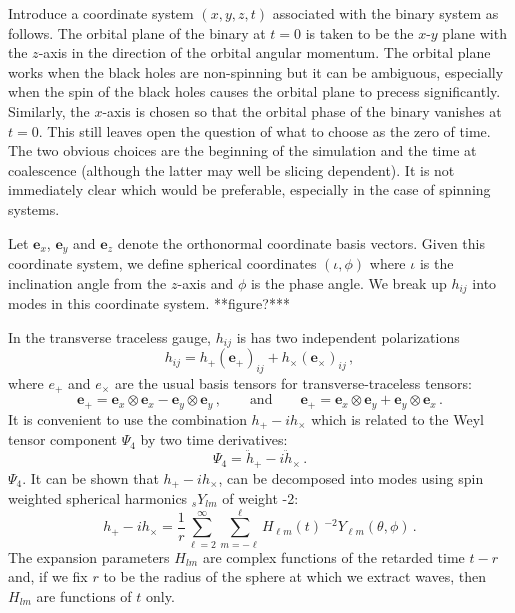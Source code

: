 \documentclass[amsmath,amssymb]{article}
\begin{document}
Introduce a coordinate system $(x,y,z,t)$ associated with the binary
system as follows.  The orbital plane of the binary at $t=0$ is taken to
be the $x$-$y$ plane with the $z$-axis in the direction of the orbital
angular momentum.  The orbital plane works when the black holes are
non-spinning but it can be ambiguous, especially when the spin of the
black holes causes the orbital plane to precess significantly.
Similarly, the $x$-axis is chosen so that the orbital phase of the
binary vanishes at $t=0$.   This still leaves open the question of what
to choose as the zero of time.  The two obvious choices are the
beginning of the simulation and the time at coalescence (although the
latter may well be slicing dependent).  It is not immediately clear
which would be preferable, especially in the case of spinning systems.

Let $\mathbf{e}_x$, $\mathbf{e}_y$ and $\mathbf{e}_z$ denote the
orthonormal coordinate basis vectors. Given this coordinate system, we
define spherical coordinates $(\iota,\phi)$ where $\iota$ is the
inclination angle from the $z$-axis and $\phi$ is the phase angle.  We
break up $h_{ij}$ into modes in this coordinate system. **figure?***

In the transverse traceless gauge, $h_{ij}$ is has two independent
polarizations 
\begin{equation}
  \label{eq:2}
  h_{ij} = h_+ (\mathbf{e}_+)_{ij} + h_\times (\mathbf{e}_\times)_{ij}\,,
\end{equation}
where $e_+$ and $e_\times$ are the usual basis tensors for
transverse-traceless tensors:
\begin{equation}
  \label{eq:9}
  \mathbf{e}_+ = \mathbf{e}_x\otimes\mathbf{e}_x -
  \mathbf{e}_y\otimes\mathbf{e}_y\,, \qquad \textrm{and} \qquad 
  \mathbf{e}_+ = \mathbf{e}_x\otimes\mathbf{e}_y + \mathbf{e}_y\otimes\mathbf{e}_x\,.
\end{equation}
It is convenient to use the combination $h_+ - ih_\times$ which is
related to the Weyl tensor component $\Psi_4$ by two time derivatives:
\begin{equation}
  \label{eq:3}
  \Psi_4 = \ddot{h}_+ -i\ddot{h}_\times\,.
\end{equation}
$\Psi_4$. It can be shown that $h_+-ih_\times$, can be decomposed into
modes using spin weighted spherical harmonics ${}_sY_{lm}$ of weight
-2:
\begin{equation}
  \label{eq:4}
  h_+ - ih_\times = \frac{1}{r}\sum_{\ell=2}^{\infty}\sum_{m=-\ell}^\ell H_{\ell m}(t)\,
  {}^{-2}Y_{\ell m}(\theta,\phi)\,.
\end{equation}
The expansion parameters $H_{lm}$ are complex functions of the retarded time
$t-r$ and, if we fix $r$ to be the radius of the sphere at which we
extract waves, then $H_{lm}$ are functions of $t$ only.  
\end{document}
